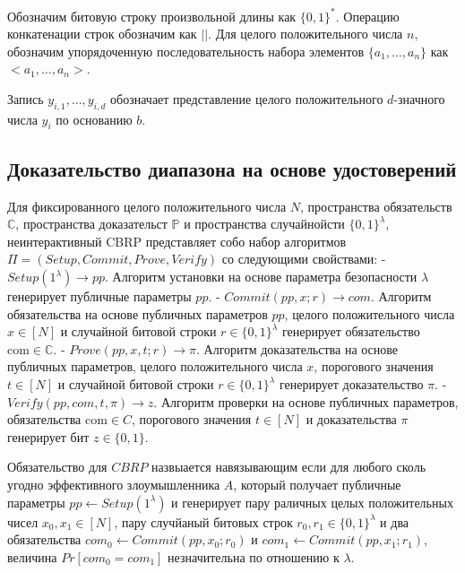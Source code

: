 \documentclass[a4paper]{report}
\newcommand{\C}{\mathbb{C}}
\renewcommand{\P}{\mathbb{P}}
\newcommand{\com}{\text{com}}
\begin{document}
	Обозначим битовую строку произвольной длины как $\{0, 1\}^*$.
	Операцию конкатенации строк обозначим как $||$.
	Для целого положительного числа $n$, обозначим упорядоченную последовательность набора элементов $\{a_1, \dots, a_n\}$ как $<a_1, \dots, a_n>$.

	Запись $y_{i, 1}, \dots, y_{i, d}$ обозначает представление целого положительного $d$-значного числа $y_i$ по основанию $b$.

	\subsection{Доказательство диапазона на основе удостоверений} %
	Для фиксированного целого положительного числа $N$, пространства обязательств $\C$, пространства доказательст $\P$ и пространства случайнойсти $\{0, 1\}^\lambda$, неинтерактивный CBRP представляет собо набор алгоритмов $\Pi = (Setup, Commit, Prove, Verify)$ со следующими свойствами:
	- $Setup(1^\lambda) \rightarrow pp$. Алгоритм установки на основе параметра безопасности $\lambda$ генерирует публичные параметры $pp$.
	- $Commit(pp, x; r) \rightarrow com$. Алгоритм обязательства на основе публичных параметров $pp$, целого положительного числа $x \in [N]$ и случайной битовой строки $r \in \{0, 1\}^\lambda$ генерирует обязательство $\com \in \C$.
	- $Prove(pp, x, t; r) \rightarrow \pi$. Алгоритм доказательства на основе публичных параметров, целого положительного числа $x$, порогового значения $t \in [N]$ и случайной битовой строки $r \in \{0, 1\}^\lambda$ генерирует доказательство $\pi$.
	- $Verify(pp, com, t, \pi) \rightarrow z$. Алгоритм проверки на основе публичных параметров, обязательства $\com \in C$, порогового значения $t \in [N]$ и доказательства $\pi$ генерирует бит $z \in \{0, 1\}$.


	Обязательство для $CBRP$ назвыается навязывающим если для любого сколь угодно эффективного злоумышленника $A$, который получает публичные параметры $pp \leftarrow Setup(1^\lambda)$ и генерирует пару раличных целых положительных чисел $x_0, x_1 \in [N]$, пару случйаный битовых строк $r_0, r_1 \in \{0, 1\}^\lambda$ и два обязательства $com_0 \leftarrow Commit(pp, x_0; r_0)$ и $com_1 \leftarrow Commit(pp, x_1; r_1)$, величина $Pr[com_0 = com_1]$ незначительна по отношению к $\lambda$.
\end{document}
